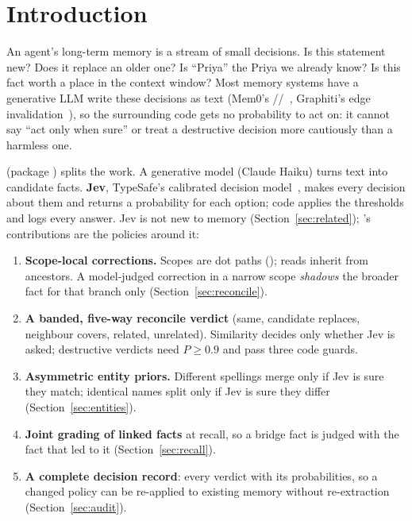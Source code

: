 \section{Introduction}
An agent's long-term memory is a stream of small decisions. Is this statement new? Does it replace an older one? Is
``Priya'' the Priya we already know? Is this fact worth a place in the context window? Most memory systems have a
generative LLM write these decisions as text (Mem0's //~\cite{mem0}, Graphiti's
edge invalidation~\cite{zep}), so the surrounding code gets no probability to act on: it cannot say ``act only when
sure'' or treat a destructive decision more cautiously than a harmless one.

\mx{} (package ) splits the work. A generative model (Claude Haiku) turns text into candidate facts.
\textbf{Jev}, TypeSafe's calibrated decision model~\cite{typesafe}, makes every decision about them and returns a
probability for each option; code applies the thresholds and logs every answer. Jev is not new to memory
(Section~\ref{sec:related}); \mx{}'s contributions are the policies around it:
\begin{enumerate}
\item \textbf{Scope-local corrections.} Scopes are dot paths (); reads inherit from
ancestors. A model-judged correction in a narrow scope \emph{shadows} the broader fact for that branch only
(Section~\ref{sec:reconcile}).
\item \textbf{A banded, five-way reconcile verdict} (same, candidate replaces, neighbour covers, related, unrelated).
Similarity decides only whether Jev is asked; destructive verdicts need $P\ge0.9$ and pass three code guards.
\item \textbf{Asymmetric entity priors.} Different spellings merge only if Jev is sure they match; identical names split
only if Jev is sure they differ (Section~\ref{sec:entities}).
\item \textbf{Joint grading of linked facts} at recall, so a bridge fact is judged with the fact that led to it
(Section~\ref{sec:recall}).
\item \textbf{A complete decision record}: every verdict with its probabilities, so a changed policy can be re-applied
to existing memory without re-extraction (Section~\ref{sec:audit}).
\end{enumerate}

